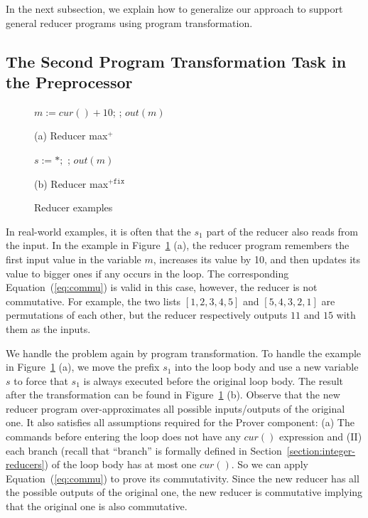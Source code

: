 \documentclass{llncs}
\newcommand{\cur}{cur()}
\begin{document}
In the next subsection, we explain how to generalize our approach to support general reducer programs using program transformation.

\subsection{The Second Program Transformation Task in the Preprocessor}
\label{sec:program_trans2}


\begin{figure}[t]
	\begin{minipage}{0.4\textwidth}
		\begin{algorithm}[H]
			\;\;$m := \cur + 10$; \;
			\Loop{}{
				$t:=\cur$\;
				\uIf{ $t> m$}{
					$m := t$ \;
				}
			};
			$out(m)$\;\;
		\end{algorithm}
		\caption*{(a) Reducer max$^+$}
	\end{minipage}
		\begin{minipage}{0.6\textwidth}
			\begin{algorithm}[H]
				$s:=*;$\;
				\Loop{}{
					\uIf{$s=1$}{$m := \cur + 10; s:= 2$}
					\uElse{
						$t:=\cur$\;
						\uIf{ $t > m$}{
							$m := t$ \;
						}
					}
				};
				$out(m)$
			\end{algorithm}
			\caption*{(b) Reducer max$^{+\mathtt{fix}}$}
		\end{minipage}
	\caption{Reducer examples}
	\label{fig:reducer_max}
\end{figure}





In real-world examples, it is often that the $s_1$ part of the reducer also reads from the input. In the example in Figure~\ref{fig:reducer_max} (a), the reducer program remembers the first input value in the variable $m$, increases its value by 10, and then updates its value to bigger ones if any occurs in the loop. The corresponding Equation~(\ref{eq:commu}) is valid in this case, however, the reducer is not commutative. For example, the two lists $[1,2,3,4,5]$ and $[5,4,3,2,1]$ are permutations of each other, but the reducer respectively outputs $11$ and $15$ with them as the inputs. 

We handle the problem again by program transformation. To handle the example in Figure~\ref{fig:reducer_max} (a), we move the prefix $s_1$ into the loop body and use a new variable $s$ to force that $s_1$ is always executed before the original loop body. The result after the transformation can be found in Figure~\ref{fig:reducer_max} (b). Observe that the new reducer program over-approximates all possible inputs/outputs of the original one.
It also satisfies all assumptions required for the Prover component: (a) The commands before entering the loop does not have any $\cur$ expression and (II) each branch (recall that ``branch'' is formally defined in Section~\ref{section:integer-reducers}) of the loop body has at most one $\cur$. So we can apply Equation~(\ref{eq:commu}) to prove its commutativity.
Since the new reducer has all the possible outputs of the original one, the new reducer is commutative implying that the original one is also commutative. 
\end{document}
